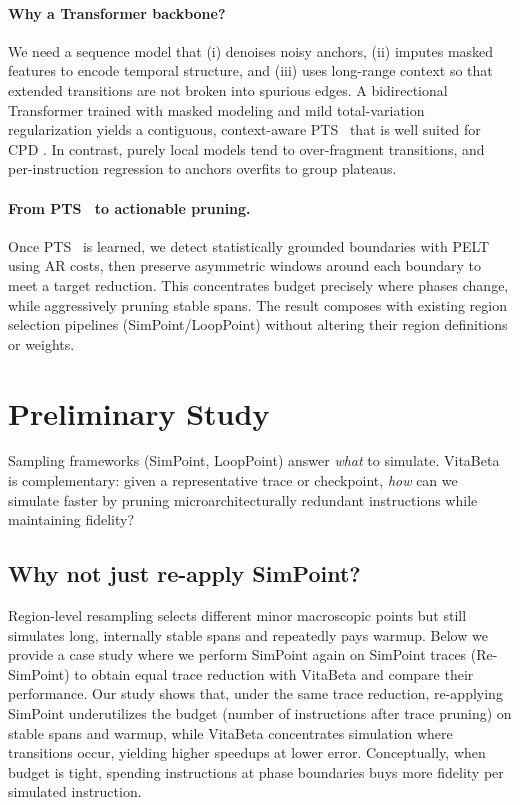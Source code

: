 \documentclass[conference]{IEEEtran}
\newcommand{\name}{VitaBeta }
\newcommand{\pts}{\textsc{PTS} }
\newcommand{\cpd}{\textsc{CPD} }
\newcommand{\pelt}{\textsc{PELT} }
\begin{document}
\paragraph{Why a Transformer backbone?}
We need a sequence model that (i) denoises noisy anchors, (ii) imputes masked features to encode temporal structure, and (iii) uses long-range context so that extended transitions are not broken into spurious edges. A bidirectional Transformer trained with masked modeling and mild total-variation regularization yields a contiguous, context-aware \pts\ that is well suited for \cpd. In contrast, purely local models tend to over-fragment transitions, and per-instruction regression to anchors overfits to group plateaus.

\paragraph{From \pts\ to actionable pruning.}
Once \pts\ is learned, we detect statistically grounded boundaries with \pelt~\cite{pelt12,ruptures20} using AR costs, then preserve asymmetric windows around each boundary to meet a target reduction. This concentrates budget precisely where phases change, while aggressively pruning stable spans. The result composes with existing region selection pipelines (SimPoint/LoopPoint) without altering their region definitions or weights.



\section{Preliminary Study}
Sampling frameworks (SimPoint, LoopPoint) answer \emph{what} to simulate. VitaBeta is complementary: given a representative trace or checkpoint, \emph{how} can we simulate faster by pruning microarchitecturally redundant instructions while maintaining fidelity?

\subsection*{Why not just re-apply SimPoint?}
Region-level resampling selects different minor macroscopic points but still simulates long, internally stable spans and repeatedly pays warmup. Below we provide a case study where we perform SimPoint again on SimPoint traces (Re-SimPoint) to obtain equal trace reduction with \name and compare their performance. Our study shows that, under the same trace reduction, re-applying SimPoint underutilizes the budget (number of instructions after trace pruning) on stable spans and warmup, while \name concentrates simulation where transitions occur, yielding higher speedups at lower error. Conceptually, when budget is tight, spending instructions at phase boundaries buys more fidelity per simulated instruction.
 
\end{document}
